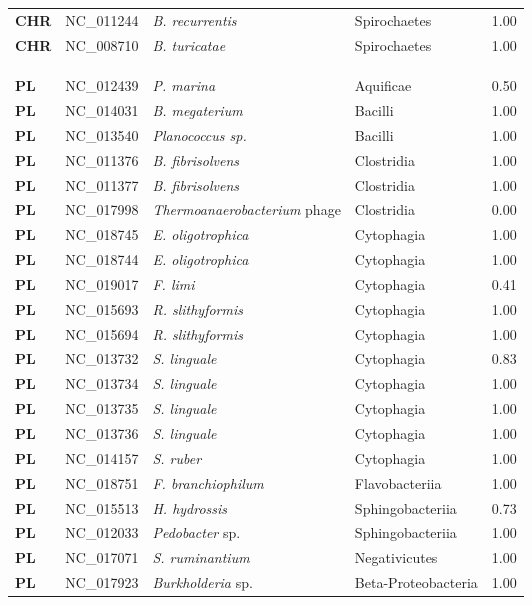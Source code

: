 \begin{adjustwidth}{-3cm}{2cm}
{\begin{supertabular}{>{\bfseries}l|p{0.1\textwidth}p{0.14\textwidth}l|l}
CHR & NC\_011244 & \textit{B. recurrentis} & Spirochaetes & 1.00\\
CHR & NC\_008710 & \textit{B. turicatae} & Spirochaetes & 1.00\\
\\
\\
\hline\\
PL & NC\_012439 & \textit{P. marina} & Aquificae & 0.50\\
PL & NC\_014031 & \textit{B. megaterium} & Bacilli & 1.00\\
PL & NC\_013540 & \textit{Planococcus sp. } & Bacilli & 1.00\\
PL & NC\_011376 & \textit{B. fibrisolvens} & Clostridia & 1.00\\
PL & NC\_011377 & \textit{B. fibrisolvens} & Clostridia & 1.00\\
PL & NC\_017998 & \textit{Thermoanaerobacterium} phage & Clostridia & 0.00\\
PL & NC\_018745 & \textit{E. oligotrophica} & Cytophagia & 1.00\\
PL & NC\_018744 & \textit{E. oligotrophica} & Cytophagia & 1.00\\
PL & NC\_019017 & \textit{F. limi} & Cytophagia & 0.41\\
PL & NC\_015693 & \textit{R. slithyformis} & Cytophagia & 1.00\\
PL & NC\_015694 & \textit{R. slithyformis} & Cytophagia & 1.00\\
PL & NC\_013732 & \textit{S. linguale} & Cytophagia & 0.83\\
PL & NC\_013734 & \textit{S. linguale} & Cytophagia & 1.00\\
PL & NC\_013735 & \textit{S. linguale} & Cytophagia & 1.00\\
PL & NC\_013736 & \textit{S. linguale} & Cytophagia & 1.00\\
PL & NC\_014157 & \textit{S. ruber} & Cytophagia & 1.00\\
PL & NC\_018751 & \textit{F. branchiophilum} & Flavobacteriia & 1.00\\
PL & NC\_015513 & \textit{H. hydrossis} & Sphingobacteriia & 0.73\\
PL & NC\_012033 & \textit{Pedobacter} sp. & Sphingobacteriia & 1.00\\
PL & NC\_017071 & \textit{S. ruminantium} & Negativicutes & 1.00\\
PL & NC\_017923 & \textit{Burkholderia} sp. & Beta-Proteobacteria & 1.00\\

\end{supertabular}}
\end{adjustwidth}
